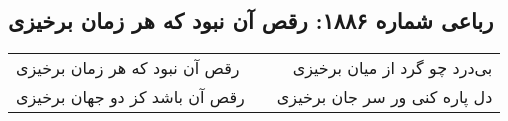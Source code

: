 \begin{center}
\section*{رباعی شماره ۱۸۸۶: رقص آن نبود که هر زمان برخیزی}
\label{sec:1886}
\begin{longtable}{l p{0.5cm} r}
رقص آن نبود که هر زمان برخیزی
&&
بی‌درد چو گرد از میان برخیزی
\\
رقص آن باشد کز دو جهان برخیزی
&&
دل پاره کنی ور سر جان برخیزی
\\
\end{longtable}
\end{center}
